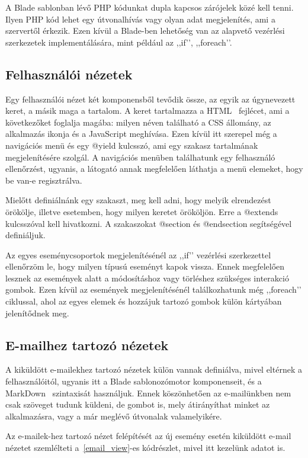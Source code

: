 \documentclass[
]{thesis-ekf}
\theoremstyle{definition}
\theoremstyle{remark}
\begin{document}
	A Blade sablonban lévő PHP kódunkat dupla kapcsos zárójelek közé kell tenni. Ilyen PHP kód lehet egy útvonalhívás vagy olyan adat megjelenítés, ami a szervertől érkezik. Ezen kívül a Blade-ben lehetőség van az alapvető vezérlési szerkezetek implementálására, mint például az ,,if’’, ,,foreach’’.
	
	\subsection{Felhasználói nézetek}
	Egy felhasználói nézet két komponensből tevődik össze, az egyik az úgynevezett keret, a másik maga a tartalom. A keret tartalmazza a HTML~\cite{html_doc} fejlécet, ami a következőket foglalja magába: milyen néven található a CSS állomány, az alkalmazás ikonja és a JavaScript meghívása. Ezen kívül itt szerepel még a navigációs menü és egy @yield kulcsszó, ami egy szakasz tartalmának megjelenítésére szolgál. A navigációs menüben találhatunk egy felhasználó ellenőrzést, ugyanis, a látogató annak megfelelően láthatja a menü elemeket, hogy be van-e regisztrálva.
	
	Mielőtt definiálnánk egy szakaszt, meg kell adni, hogy melyik elrendezést örökölje, illetve esetemben, hogy milyen keretet örököljön. Erre a @extends kulcsszóval kell hivatkozni. A szakaszokat @section és @endsection segítségével definiáljuk.
	
	Az egyes eseménycsoportok megjelenítésénél az ,,if’’ vezérlési szerkezettel ellenőrzöm le, hogy milyen típusú eseményt kapok vissza. Ennek megfelelően lesznek az események alatt a módosításhoz vagy törléshez szükséges interakció gombok. Ezen kívül az események megjelenítésénél találkozhatunk még ,,foreach’’ ciklussal, ahol az egyes elemek és hozzájuk tartozó gombok külön kártyában jelenítődnek meg. 
	
	\subsection{E-mailhez tartozó nézetek}
	A kiküldött e-mailekhez tartozó nézetek külön vannak definiálva, mivel eltérnek a felhasználóitól, ugyanis itt a Blade sablonozómotor komponenseit, és a MarkDown~\cite{markdown_page} szintaxisát használjuk. Ennek köszönhetően az e-mailünkben nem csak szöveget tudunk küldeni, de gombot is, mely átirányíthat minket az alkalmazásra, vagy a már meglévő útvonalak valamelyikére.
	
	Az e-mailek-hez tartozó nézet felépítését az új esemény esetén kiküldött e-mail nézetet szemlélteti a~\ref{email_view}-es kódrészlet, mivel itt kezelünk adatot is. 
	
\end{document}
